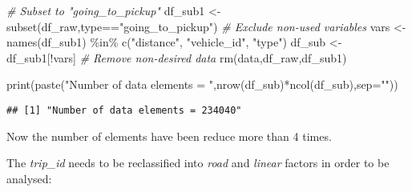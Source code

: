 \documentclass[
]{article}
\newenvironment{Shaded}{\begin{snugshade}}{\end{snugshade}}
\newcommand{\AttributeTok}[1]{\textcolor[rgb]{0.77,0.63,0.00}{#1}}
\newcommand{\CommentTok}[1]{\textcolor[rgb]{0.56,0.35,0.01}{\textit{#1}}}
\newcommand{\FunctionTok}[1]{\textcolor[rgb]{0.00,0.00,0.00}{#1}}
\newcommand{\NormalTok}[1]{#1}
\newcommand{\OtherTok}[1]{\textcolor[rgb]{0.56,0.35,0.01}{#1}}
\newcommand{\SpecialCharTok}[1]{\textcolor[rgb]{0.00,0.00,0.00}{#1}}
\newcommand{\StringTok}[1]{\textcolor[rgb]{0.31,0.60,0.02}{#1}}
\begin{document}
\begin{Shaded}
\begin{Highlighting}[]
\CommentTok{\# Subset to "going\_to\_pickup"}
\NormalTok{df\_sub1 }\OtherTok{\textless{}{-}} \FunctionTok{subset}\NormalTok{(df\_raw,type}\SpecialCharTok{==}\StringTok{"going\_to\_pickup"}\NormalTok{)}
\CommentTok{\# Exclude non{-}used variables}
\NormalTok{vars }\OtherTok{\textless{}{-}} \FunctionTok{names}\NormalTok{(df\_sub1) }\SpecialCharTok{\%in\%} \FunctionTok{c}\NormalTok{(}\StringTok{"distance"}\NormalTok{, }\StringTok{"vehicle\_id"}\NormalTok{, }\StringTok{"type"}\NormalTok{)}
\NormalTok{df\_sub }\OtherTok{\textless{}{-}}\NormalTok{ df\_sub1[}\SpecialCharTok{!}\NormalTok{vars]}
\CommentTok{\# Remove non{-}desired data}
\FunctionTok{rm}\NormalTok{(data,df\_raw,df\_sub1)}

\FunctionTok{print}\NormalTok{(}\FunctionTok{paste}\NormalTok{(}\StringTok{"Number of data elements = "}\NormalTok{,}\FunctionTok{nrow}\NormalTok{(df\_sub)}\SpecialCharTok{*}\FunctionTok{ncol}\NormalTok{(df\_sub),}\AttributeTok{sep=}\StringTok{""}\NormalTok{))}
\end{Highlighting}
\end{Shaded}

\begin{verbatim}
## [1] "Number of data elements = 234040"
\end{verbatim}

Now the number of elements have been reduce more than 4 times.

The \emph{trip\_id} needs to be reclassified into \emph{road} and
\emph{linear} factors in order to be analysed:
\end{document}
